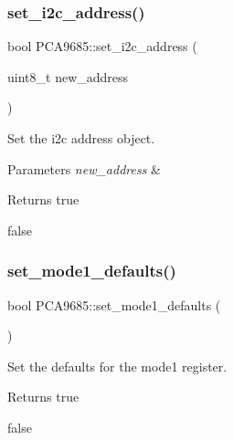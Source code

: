 \subsubsection{\texorpdfstring{set\+\_\+i2c\+\_\+address()}{set\_i2c\_address()}}
{\footnotesize\ttfamily bool P\+C\+A9685\+::set\+\_\+i2c\+\_\+address (\begin{DoxyParamCaption}\item[{uint8\+\_\+t}]{new\+\_\+address }\end{DoxyParamCaption})}



Set the i2c address object. 


\begin{DoxyParams}{Parameters}
{\em new\+\_\+address} & \\
\hline
\end{DoxyParams}
\begin{DoxyReturn}{Returns}
true 

false 
\end{DoxyReturn}
\mbox{\label{class_p_c_a9685_aca492db18fc9b23e82783fb49cc897d9}} 
\subsubsection{\texorpdfstring{set\+\_\+mode1\+\_\+defaults()}{set\_mode1\_defaults()}}
{\footnotesize\ttfamily bool P\+C\+A9685\+::set\+\_\+mode1\+\_\+defaults (\begin{DoxyParamCaption}{ }\end{DoxyParamCaption})}



Set the defaults for the mode1 register. 

\begin{DoxyReturn}{Returns}
true 

false 
\end{DoxyReturn}
\mbox{\label{class_p_c_a9685_acf15c2c347bd44aa5fd33fd666e6e276}} 

